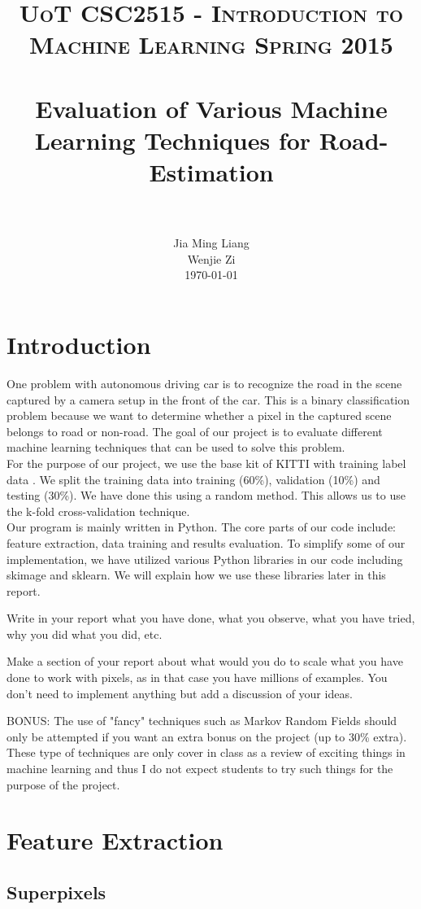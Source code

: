 \documentclass[paper=letter, fontsize=11pt]{scrartcl}
\title{
		\usefont{OT1}{bch}{b}{n}
		\normalfont \normalsize \textsc{UoT CSC2515 - Introduction to Machine Learning Spring 2015} \\ [25pt]
		\horrule{0.5pt} \\[0.4cm]
		\huge Evaluation of Various Machine Learning Techniques for Road-Estimation \\
		\horrule{2pt} \\[0.5cm]
}
\author{
		\normalfont 								\normalsize
        Jia Ming Liang\\[-3pt]		\normalsize
        Wenjie Zi\\[-3pt]		\normalsize
        \today
}
\date{}
\numberwithin{equation}{section}		%
\numberwithin{figure}{section}			%
\numberwithin{table}{section}				%
\begin{document}
\maketitle
\section{Introduction}

One problem with autonomous driving car is to recognize the road in the scene captured by a camera setup in the front of the car. This is a binary classification problem because we want to determine whether a pixel in the captured scene belongs to road or non-road. The goal of our project is to evaluate different machine learning techniques that can be used to solve this problem. \\

For the purpose of our project, we use the base kit of KITTI with training label data \cite{bib:kitti}. We split the training data into training (60\%), validation (10\%) and testing (30\%). We have done this using a random method. This allows us to use the k-fold cross-validation technique.\\

Our program is mainly written in Python. The core parts of our code include: feature extraction, data training and results evaluation. To simplify some of our implementation, we have utilized various Python libraries in our code including skimage and sklearn. We will explain how we use these libraries later in this report.

\if
Write in your report what you have done, what you observe, what you have tried, why you did what you did, etc.

Make a section of your report about what would you do to scale what you have done to work with pixels, as in that case you have millions of examples. You don't need to implement anything
but add a discussion of your ideas.

BONUS: The use of "fancy" techniques such as Markov Random Fields should only be attempted if you want an extra bonus on the project (up to 30\% extra). These type of techniques are only cover in class as a review of exciting things in machine learning and thus I do not expect students to try such things for the purpose of the project.
\fi
\section{Feature Extraction}
\subsection{Superpixels}
\end{document}
